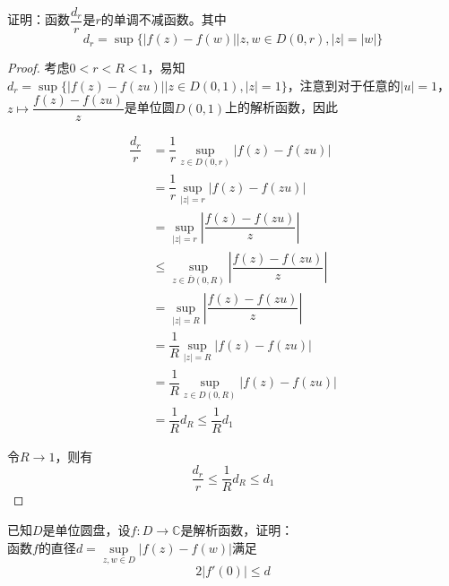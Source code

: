 \begin{proposition}

    证明：函数$\dfrac{d_r}{r}$是$r$的单调不减函数。其中
    $$d_r = \sup\{|f(z) - f(w)|\big| z,w \in D(0,r), |z| = |w|\}$$

\end{proposition}

\begin{proof}

    考虑$0 < r < R < 1$，易知$d_r = \sup\{|f(z) - f(zu)| \big| z \in D(0,1), |z| = 1 \}$，注意到对于任意的$|u| = 1$，$z \mapsto  \dfrac{f(z) - f(zu)}{z}$是单位圆$D(0,1)$上的解析函数，因此
    
    \begin{align*}
        \dfrac{d_r}{r} & = \dfrac{1}{r} \sup_{z \in D(0,r)}{|f(z) - f(zu)|} \\
        & = \dfrac{1}{r} \sup_{|z| = r}{|f(z) - f(zu)|} \\
        & = \sup_{|z| = r}{\left| \dfrac{f(z) - f(zu)}{z}\right|} \\
        & \leq \sup_{z \in \overline{D}(0,R)}{\left| \dfrac{f(z) - f(zu)}{z}\right|} \\
        & = \sup_{|z| = R}{\left| \dfrac{f(z) - f(zu)}{z}\right|} \\
        & = \dfrac{1}{R} \sup_{|z| = R}{|f(z) - f(zu)|} \\
        & = \dfrac{1}{R} \sup_{z \in D(0,R)}{|f(z) - f(zu)|} \\
        & = \dfrac{1}{R} d_{R} \leq \dfrac{1}{R} d_{1}
    \end{align*}

    令$R \to 1$，则有
    $$\dfrac{d_{r}}{r} \leq \dfrac{1}{R} d_{R} \leq d_1$$

\end{proof}

\begin{proposition}

    已知$D$是单位圆盘，设$f:D \to \mathbb{C}$是解析函数，证明：\\
    函数$f$的直径$d = \sup\limits_{z,w\in D}{|f(z) - f(w)|}$满足
    $$2|f'(0)| \leq d$$

\end{proposition}

